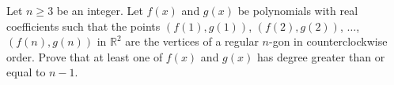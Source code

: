 Let $n \geq 3$ be an integer.
Let $f(x)$ and $g(x)$ be polynomials with real coefficients such that the points $(f(1), g(1))$, $(f(2), g(2))$, $\dots$, $(f(n), g(n))$ in $\mathbb{R}^2$ are the vertices of a regular $n$-gon in counterclockwise order.
Prove that at least one of $f(x)$ and $g(x)$ has degree greater than or equal to $n-1$.
